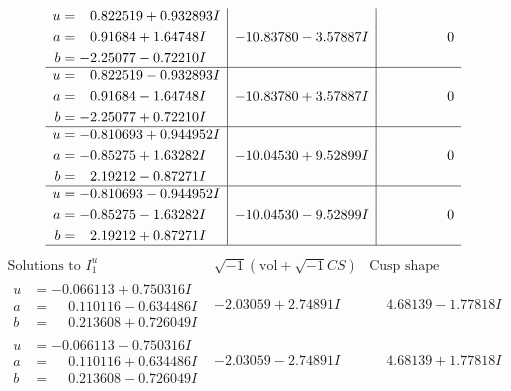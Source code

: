 \documentclass[1p]{elsarticle_modified}
\theoremstyle{definition}
\newcommand{\I}{\sqrt{-1}}
\begin{document}
$$\begin{array}{c|c|c}
\begin{aligned}
u &= \phantom{-}0.822519 + 0.932893 I \\
a &= \phantom{-}0.91684 + 1.64748 I \\
b &= -2.25077 - 0.72210 I\end{aligned}
 & -10.83780 - 3.57887 I & \phantom{-0.000000 } 0 \\ \hline\begin{aligned}
u &= \phantom{-}0.822519 - 0.932893 I \\
a &= \phantom{-}0.91684 - 1.64748 I \\
b &= -2.25077 + 0.72210 I\end{aligned}
 & -10.83780 + 3.57887 I & \phantom{-0.000000 } 0 \\ \hline\begin{aligned}
u &= -0.810693 + 0.944952 I \\
a &= -0.85275 + 1.63282 I \\
b &= \phantom{-}2.19212 - 0.87271 I\end{aligned}
 & -10.04530 + 9.52899 I & \phantom{-0.000000 } 0 \\ \hline\begin{aligned}
u &= -0.810693 - 0.944952 I \\
a &= -0.85275 - 1.63282 I \\
b &= \phantom{-}2.19212 + 0.87271 I\end{aligned}
 & -10.04530 - 9.52899 I & \phantom{-0.000000 } 0\\
 \hline 
 \end{array}$$\newpage$$\begin{array}{c|c|c}  
\text{Solutions to }I^u_{1}& \I (\text{vol} + \sqrt{-1}CS) & \text{Cusp shape}\\
 \hline 
\begin{aligned}
u &= -0.066113 + 0.750316 I \\
a &= \phantom{-}0.110116 - 0.634486 I \\
b &= \phantom{-}0.213608 + 0.726049 I\end{aligned}
 & -2.03059 + 2.74891 I & \phantom{-}4.68139 - 1.77818 I \\ \hline\begin{aligned}
u &= -0.066113 - 0.750316 I \\
a &= \phantom{-}0.110116 + 0.634486 I \\
b &= \phantom{-}0.213608 - 0.726049 I\end{aligned}
 & -2.03059 - 2.74891 I & \phantom{-}4.68139 + 1.77818 I \\ \hline\begin{aligned}

\end{aligned}
\end{array}$$
\end{document}
